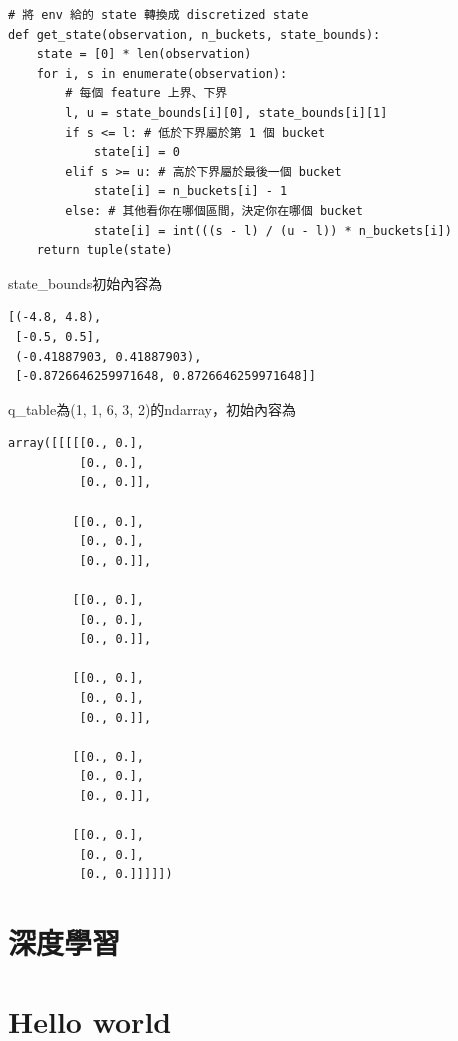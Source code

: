 \documentclass[a4paper,12pt]{article}
\begin{document}
\begin{enumerate}
\begin{enumerate}
\begin{lstlisting}
# 將 env 給的 state 轉換成 discretized state
def get_state(observation, n_buckets, state_bounds):
    state = [0] * len(observation)
    for i, s in enumerate(observation):
        # 每個 feature 上界、下界
        l, u = state_bounds[i][0], state_bounds[i][1]
        if s <= l: # 低於下界屬於第 1 個 bucket
            state[i] = 0
        elif s >= u: # 高於下界屬於最後一個 bucket
            state[i] = n_buckets[i] - 1
        else: # 其他看你在哪個區間，決定你在哪個 bucket
            state[i] = int(((s - l) / (u - l)) * n_buckets[i])
    return tuple(state)
\end{lstlisting}

state\_bounds初始內容為\\
\lstset{breaklines=true,language=Python,label= ,caption= ,captionpos=b,firstnumber=1,numbers=left}
\begin{lstlisting}
[(-4.8, 4.8),
 [-0.5, 0.5],
 (-0.41887903, 0.41887903),
 [-0.8726646259971648, 0.8726646259971648]]
\end{lstlisting}

q\_table為(1, 1, 6, 3, 2)的ndarray，初始內容為\\
\lstset{breaklines=true,language=Python,label= ,caption= ,captionpos=b,firstnumber=1,numbers=left}
\begin{lstlisting}
array([[[[[0., 0.],
          [0., 0.],
          [0., 0.]],

         [[0., 0.],
          [0., 0.],
          [0., 0.]],

         [[0., 0.],
          [0., 0.],
          [0., 0.]],

         [[0., 0.],
          [0., 0.],
          [0., 0.]],

         [[0., 0.],
          [0., 0.],
          [0., 0.]],

         [[0., 0.],
          [0., 0.],
          [0., 0.]]]]])
\end{lstlisting}
\end{enumerate}
\end{enumerate}

\section{深度學習}
\label{sec:org7b20aee}
\newpage

\section{Hello world}
\label{sec:org280da05}
\newpage
\end{document}
